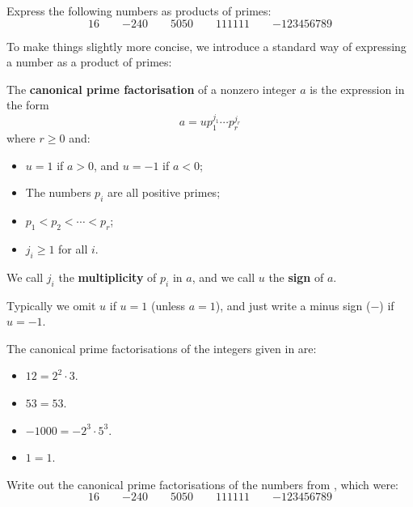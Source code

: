 \begin{exercise}
\label{exNumbersAsProductsOfPrimes}
Express the following numbers as products of primes:
\[ 16 \qquad {-240} \qquad 5050 \qquad 111111 \qquad {-123456789} \]
\end{exercise}

To make things slightly more concise, we introduce a standard way of expressing a number as a product of primes:

\begin{definition}
The \textbf{canonical prime factorisation} of a nonzero integer $a$ is the expression in the form
\[ a = u p_1^{j_1} \cdots p_r^{j_r} \]
where $r \ge 0$ and:
\begin{itemize} \vspace{5pt}
\item $u = 1$ if $a>0$, and $u = -1$ if $a<0$;
\item The numbers $p_i$ are all positive primes;
\item $p_1 < p_2 < \cdots < p_r$;
\item $j_i \ge 1$ for all $i$.
\end{itemize}

\vspace{5pt}
We call $j_i$ the \textbf{multiplicity} of $p_i$ in $a$, and we call $u$ the \textbf{sign} of $a$.
\end{definition}

Typically we omit $u$ if $u=1$ (unless $a=1$), and just write a minus sign ($-$) if $u=-1$.

\begin{example}
The canonical prime factorisations of the integers given in  are:
\begin{itemize}
\item $12 = 2^2 \cdot 3$.
\item $53 = 53$.
\item $-1000 = -2^3 \cdot 5^3$.
\item $1=1$.
\end{itemize}
\end{example}

\begin{exercise}
Write out the canonical prime factorisations of the numbers from , which were:
\[ 16 \qquad {-240} \qquad 5050 \qquad 111111 \qquad {-123456789} \]
\end{exercise}

